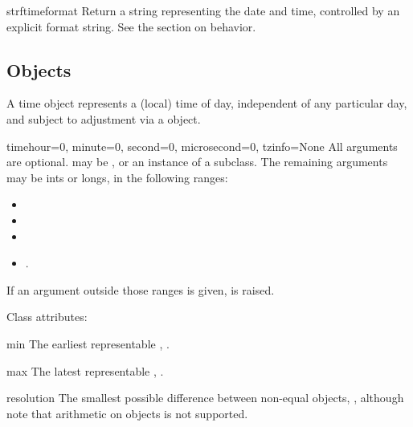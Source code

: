 \begin{methoddesc}{strftime}{format}
  Return a string representing the date and time, controlled by an
  explicit format string.  See the section on 
  behavior.
\end{methoddesc}


\subsection{ Objects \label{datetime-time}}

A time object represents a (local) time of day, independent of any
particular day, and subject to adjustment via a  object.

\begin{classdesc}{time}{hour=0, minute=0, second=0, microsecond=0,
                        tzinfo=None}
  All arguments are optional.   may be , or
  an instance of a  subclass.  The remaining arguments
  may be ints or longs, in the following ranges:

  \begin{itemize}
    \item {}
    \item {}
    \item {}
    \item {}.
  \end{itemize}

  If an argument outside those ranges is given,
   is raised.
\end{classdesc}

Class attributes:

\begin{memberdesc}{min}
  The earliest representable , .
\end{memberdesc}

\begin{memberdesc}{max}
  The latest representable , .
\end{memberdesc}

\begin{memberdesc}{resolution}
  The smallest possible difference between non-equal 
  objects, , although note that
  arithmetic on  objects is not supported.
\end{memberdesc}

